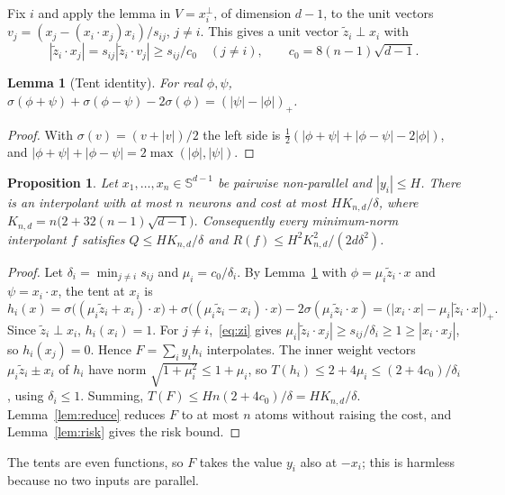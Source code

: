 \documentclass[11pt]{amsart}
\newtheorem{lemma}[theorem]{Lemma}
\newtheorem{proposition}[theorem]{Proposition}
\theoremstyle{remark}
\numberwithin{equation}{section}
\newcommand{\Sph}{\mathbb{S}^{d-1}}
\begin{document}
Fix $i$ and apply the lemma in $V=x_i^\perp$, of dimension $d-1$, to the unit vectors $v_j=(x_j-(x_i\cdot x_j)x_i)/s_{ij}$, $j\ne i$. This gives a unit vector $\tilde z_i\perp x_i$ with
\begin{equation}\label{eq:zi}
|\tilde z_i\cdot x_j|=s_{ij}|\tilde z_i\cdot v_j|\ge s_{ij}/c_0\quad(j\neq i),\qquad c_0=8(n-1)\sqrt{d-1}.
\end{equation}

\begin{lemma}[Tent identity]\label{lem:tent}
For real $\phi,\psi$, $\sigma(\phi+\psi)+\sigma(\phi-\psi)-2\sigma(\phi)=(|\psi|-|\phi|)_+$.
\end{lemma}
\begin{proof}
With $\sigma(v)=(v+|v|)/2$ the left side is $\frac12(|\phi+\psi|+|\phi-\psi|-2|\phi|)$, and $|\phi+\psi|+|\phi-\psi|=2\max(|\phi|,|\psi|)$.
\end{proof}

\begin{proposition}\label{prop:tents}
Let $x_1,\dots,x_n\in\Sph$ be pairwise non-parallel and $|y_i|\le H$. There is an interpolant with at most $n$ neurons and cost at most $HK_{n,d}/\delta$, where $K_{n,d}=n\bigl(2+32(n-1)\sqrt{d-1}\bigr)$. Consequently every minimum-norm interpolant $f$ satisfies $Q\le HK_{n,d}/\delta$ and $R(f)\le H^2K_{n,d}^2/(2d\delta^2)$.
\end{proposition}
\begin{proof}
Let $\delta_i=\min_{j\ne i}s_{ij}$ and $\mu_i=c_0/\delta_i$. By Lemma~\ref{lem:tent} with $\phi=\mu_i\tilde z_i\cdot x$ and $\psi=x_i\cdot x$, the tent at $x_i$ is
\[
h_i(x)=\sigma\bigl((\mu_i\tilde z_i+x_i)\cdot x\bigr)+\sigma\bigl((\mu_i\tilde z_i-x_i)\cdot x\bigr)-2\sigma(\mu_i\tilde z_i\cdot x)=\bigl(|x_i\cdot x|-\mu_i|\tilde z_i\cdot x|\bigr)_+ .
\]
Since $\tilde z_i\perp x_i$, $h_i(x_i)=1$. For $j\ne i$,~\eqref{eq:zi} gives $\mu_i|\tilde z_i\cdot x_j|\ge s_{ij}/\delta_i\ge1\ge|x_i\cdot x_j|$, so $h_i(x_j)=0$. Hence $F=\sum_iy_ih_i$ interpolates. The inner weight vectors $\mu_i\tilde z_i\pm x_i$ of $h_i$ have norm $\sqrt{1+\mu_i^2}\le1+\mu_i$, so $T(h_i)\le2+4\mu_i\le(2+4c_0)/\delta_i$, using $\delta_i\le1$. Summing, $T(F)\le Hn(2+4c_0)/\delta=HK_{n,d}/\delta$. Lemma~\ref{lem:reduce} reduces $F$ to at most $n$ atoms without raising the cost, and Lemma~\ref{lem:risk} gives the risk bound.
\end{proof}

The tents are even functions, so $F$ takes the value $y_i$ also at $-x_i$; this is harmless because no two inputs are parallel.
\end{document}
